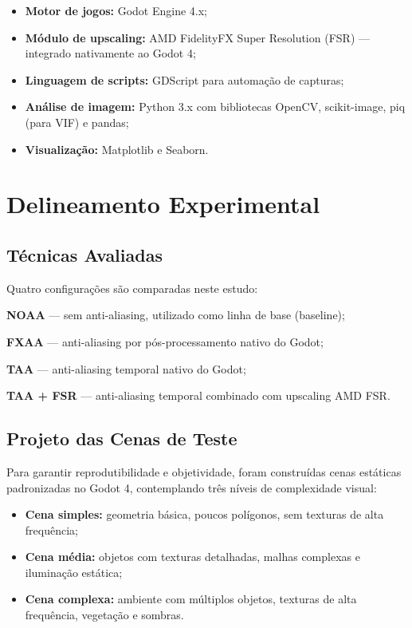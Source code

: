 \documentclass[twoside,english,brazilian]{UNISINOSmonografia}
\begin{document}
\begin{itemize}
    \item \textbf{Motor de jogos:} Godot Engine 4.x;
    \item \textbf{Módulo de upscaling:} AMD FidelityFX Super Resolution (FSR) — integrado nativamente ao Godot 4;
    \item \textbf{Linguagem de scripts:} GDScript para automação de capturas;
    \item \textbf{Análise de imagem:} Python 3.x com bibliotecas OpenCV, scikit-image, piq (para VIF) e pandas;
    \item \textbf{Visualização:} Matplotlib e Seaborn.
\end{itemize}

\section{Delineamento Experimental}

\subsection{Técnicas Avaliadas}

Quatro configurações são comparadas neste estudo:

\begin{alineas}
    \item \textbf{NOAA} — sem anti-aliasing, utilizado como linha de base (baseline);
    \item \textbf{FXAA} — anti-aliasing por pós-processamento nativo do Godot;
    \item \textbf{TAA} — anti-aliasing temporal nativo do Godot;
    \item \textbf{TAA + FSR} — anti-aliasing temporal combinado com upscaling AMD FSR.
\end{alineas}

\subsection{Projeto das Cenas de Teste}

Para garantir reprodutibilidade e objetividade, foram construídas cenas estáticas padronizadas no Godot 4, contemplando três níveis de complexidade visual:

\begin{itemize}
    \item \textbf{Cena simples:} geometria básica, poucos polígonos, sem texturas de alta frequência;
    \item \textbf{Cena média:} objetos com texturas detalhadas, malhas complexas e iluminação estática;
    \item \textbf{Cena complexa:} ambiente com múltiplos objetos, texturas de alta frequência, vegetação e sombras.
\end{itemize}
\end{document}
